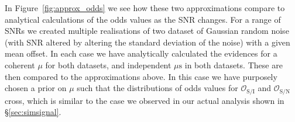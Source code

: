 In Figure~\ref{fig:approx_odds} we see how these two approximations compare to analytical calculations of the odds values as the SNR changes. For a range of SNRs
we created multiple realisations of two dataset of Gaussian random noise (with SNR altered by altering the standard deviation of the noise) with a given
mean offset. In each case we have analytically calculated the evidences for a coherent $\mu$ for both datasets, and independent $\mu\text{s}$ in both datasets.
These are then compared to the approximations above. In this case we have purposely chosen a prior on $\mu$ such that the distributions of odds values for
$\mathcal{O}_{\text{S}/\text{I}}$ and $\mathcal{O}_{\text{S}/\text{N}}$ cross, which is similar to the case we observed in our actual analysis shown in \S\ref{sec:simsignal}.
